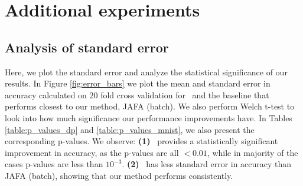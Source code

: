 \documentclass[letterpaper]{article}
\begin{document}
\section{Additional experiments}
\label{app:exp}
\subsection{Analysis of standard error}
Here, we plot the standard error and analyze the statistical significance of our results. In Figure \ref{fig:error_bars} we plot the mean and standard error in accuracy calculated on $20$ fold cross validation for \our\ and the baseline that performs closest to our method, JAFA (batch).
We also perform Welch t-test to look into how much significance our performance improvements have.
In Tables \ref{table:p_values_dp} and \ref{table:p_values_mnist}, we also present the corresponding p-values.  We observe: \textbf{(1)} \our\ provides a statistically significant improvement in accuracy, as the p-values are all $<0.01$, while in majority of the cases p-values are less than $10^{-3}$.  \textbf{(2)} \our\ has less standard error in accuracy than JAFA (batch), showing that our method performs consistently.
\end{document}
